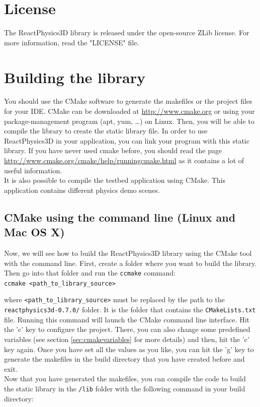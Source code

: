 \documentclass[a4paper,12pt]{article}
\begin{document}
    \section{License}

    The ReactPhysics3D library is released under the open-source ZLib license. For more information, read the "LICENSE" file.

    \section{Building the library}
    \label{sec:building}

    You should use the CMake software to generate the makefiles or the
    project files for your IDE. CMake can be downloaded at
    \url{http://www.cmake.org} or using your package-management program
    (apt, yum, \dots) on Linux. Then, you will be able to compile the library to create the static library
    file. In order to use ReactPhysics3D in your application, you can link your program with this static library.
    If you have never used cmake before, you should read the page \url{http://www.cmake.org/cmake/help/runningcmake.html} as
    it contains a lot of useful information. \\

    It is also possible to compile the testbed application using CMake. This application contains different
    physics demo scenes. 

    \subsection{CMake using the command line (Linux and Mac OS X)}

    Now, we will see how to build the ReactPhysics3D library using the CMake tool with the command line.
    First, create a folder where you want to build the library. Then go into that folder and run
    the \texttt{ccmake} command: \\

    \texttt{ccmake \textless path\_to\_library\_source\textgreater} \\

    \begin{sloppypar}
    where \texttt{\textless path\_to\_library\_source\textgreater} must be replaced
    by the path to the \texttt{reactphysics3d-0.7.0/} folder. It is the folder that
    contains the \texttt{CMakeLists.txt} file. Running this command will launch the CMake command line interface.
    Hit the 'c' key to configure the project. There, you can also change some predefined variables (see section \ref{sec:cmakevariables} for more details)
    and then, hit the 'c' key again. Once you have set all the values as you like, you can hit the 'g' key to generate the makefiles in the build directory
    that you have created before and exit. \\

    Now that you have generated the makefiles, you can compile the code to build the static library in the
    \texttt{/lib} folder with the following command in your build directory: \\

    \end{sloppypar}
\end{document}
